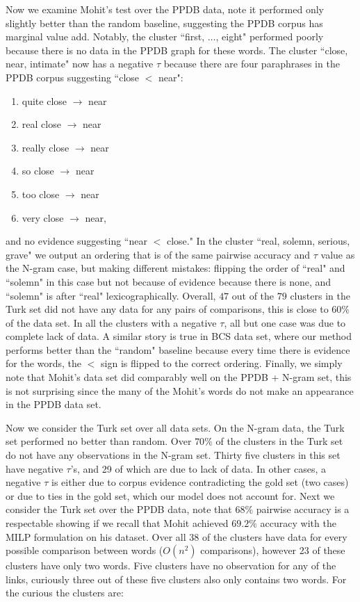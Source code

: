 Now we examine Mohit's test over the PPDB data, note it performed only slightly better than the random baseline, suggesting the PPDB corpus has marginal value add. Notably, the cluster ``first, $\ldots$, eight" performed poorly because there is no data in the PPDB graph for these words. The cluster ``close, near, intimate" now has a negative $\tau$ because there are four paraphrases in the PPDB corpus suggesting ``close $<$ near":

\begin{enumerate}
	 \item quite close $\rightarrow$  near
	 \item real close $\rightarrow$  near
	 \item really close $\rightarrow$  near
	 \item so close $\rightarrow$  near
	 \item too close $\rightarrow$  near
	 \item very close $\rightarrow$  near,
\end{enumerate}

and no evidence suggesting ``near $<$ close." In the cluster ``real, solemn, serious, grave" we output an ordering that is of the same pairwise accuracy and $\tau$ value as the N-gram case, but making different mistakes: flipping the order of ``real" and ``solemn" in this case but not because of evidence because there is none, and ``solemn" is after ``real" lexicographically. Overall, $47$ out of the $79$ clusters in the Turk set did not have any data for any pairs of comparisons, this is close to $60\%$ of the data set. In all the clusters with a negative $\tau$, all but one case was due to complete lack of data. A similar story is true in BCS data set, where our method performs better than the ``random" baseline because every time there is evidence for the words, the $<$ sign is flipped to the correct ordering. Finally, we simply note that Mohit's data set did comparably well on the PPDB + N-gram set, this is not surprising since the many of the Mohit's words do not make an appearance in the PPDB data set. 

Now we consider the Turk set over all data sets. On the N-gram data, the Turk set performed no better than random. Over $70\%$ of the clusters in the Turk set do not have any observations in the N-gram set. Thirty five clusters in this set have negative $\tau$'s, and 29 of which are due to lack of data. In other cases, a negative $\tau$ is either due to corpus evidence contradicting the gold set (two cases) or due to ties in the gold set, which our model does not account for. Next we consider the Turk set over the PPDB data, note that $68\%$ pairwise accuracy is a respectable showing if we recall that Mohit achieved $69.2\%$ accuracy with the MILP formulation on his dataset. Over all 38 of the clusters have data for every possible comparison between words ($O(n^2)$ comparisons), however 23 of these clusters have only two words. Five clusters have no observation for any of the links, curiously three out of these five clusters also only contains two words. For the curious the clusters are:

